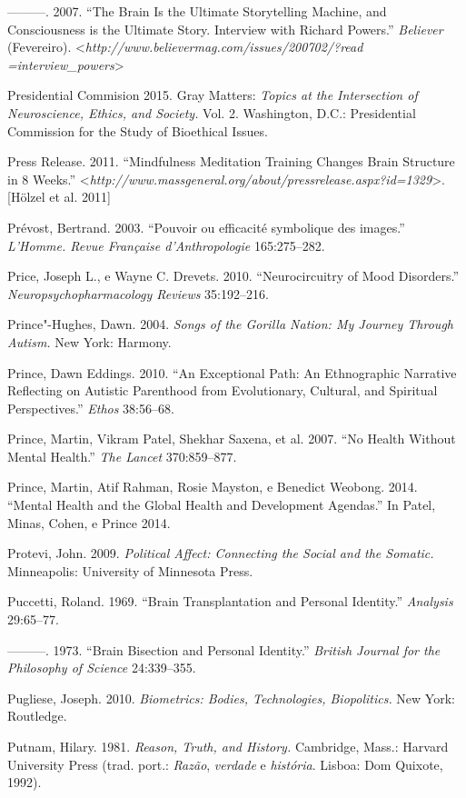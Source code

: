 ---------. 2007. ``The Brain Is the Ultimate Storytelling Machine, and
Consciousness is the Ultimate Story. Interview with Richard Powers.''
\emph{Believer} (Fevereiro).
\textless{}\emph{http://www.believermag.com/issues/200702/?read​=interview\_powers}\textgreater{}

Presidential Commision 2015. Gray Matters: \emph{Topics at the
Intersection of Neuroscience, Ethics, and Society.} Vol. 2. Washington,
D.C.: Presidential Commission for the Study of Bioethical Issues.

Press Release. 2011. ``Mindfulness Meditation Training Changes Brain
Structure in 8 Weeks.''
\textless{}\emph{http://www.massgeneral.org/about/pressrelease.aspx?id​=1329}\textgreater{}.
{[}Hölzel et al. 2011{]}

Prévost, Bertrand. 2003. ``Pouvoir ou efficacité symbolique des
images.'' \emph{L'Homme. Revue Française d'Anthropologie} 165:275--282.

Price, Joseph L., e Wayne C. Drevets. 2010. ``Neurocircuitry of Mood
Disorders.'' \emph{Neuropsychopharmacology Reviews} 35:192--216.

Prince"-Hughes, Dawn. 2004. \emph{Songs of the Gorilla Nation: My Journey
Through Autism.} New York: Harmony.

Prince, Dawn Eddings. 2010. ``An Exceptional Path: An Ethnographic
Narrative Reflecting on Autistic Parenthood from Evolutionary, Cultural,
and Spiritual Perspectives.'' \emph{Ethos} 38:56--68.

Prince, Martin, Vikram Patel, Shekhar Saxena, et al. 2007. ``No Health
Without Mental Health.'' \emph{The Lancet} 370:859--877.

Prince, Martin, Atif Rahman, Rosie Mayston, e Benedict Weobong. 2014.
``Mental Health and the Global Health and Development Agendas.'' In
Patel, Minas, Cohen, e Prince 2014.

Protevi, John. 2009. \emph{Political Affect: Connecting the Social and
the Somatic.} Minneapolis: University of Minnesota Press.

Puccetti, Roland. 1969. ``Brain Transplantation and Personal Identity.''
\emph{Analysis} 29:65--77.

---------. 1973. ``Brain Bisection and Personal Identity.''
\emph{British Journal for the Philosophy of Science} 24:339--355.

Pugliese, Joseph. 2010. \emph{Biometrics: Bodies, Technologies,
Biopolitics.} New York: Routledge.

Putnam, Hilary. 1981. \emph{Reason, Truth, and History.} Cambridge,
Mass.: Harvard University Press (trad. port.: \emph{Razão},
\emph{verdade} e \emph{história}. Lisboa: Dom Quixote, 1992).

